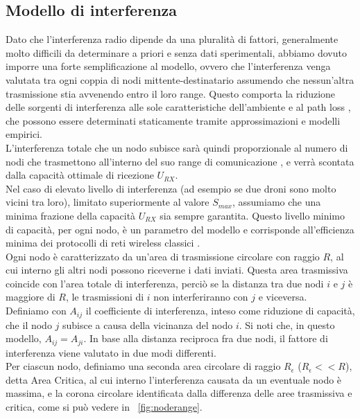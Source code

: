 \subsection{Modello di interferenza}
Dato che l'interferenza radio dipende da una pluralità di fattori, generalmente molto difficili da determinare a priori e senza dati sperimentali, abbiamo dovuto imporre una forte semplificazione al modello, ovvero che l'interferenza venga valutata tra ogni coppia di nodi mittente-destinatario assumendo che nessun'altra trasmissione stia avvenendo entro il loro range. Questo comporta la riduzione delle sorgenti di interferenza alle sole caratteristiche dell'ambiente e al path loss \cite{Killat:2009:EMP:1554307.1554311}, che possono essere determinati staticamente tramite approssimazioni e modelli empirici. \\
L'interferenza totale che un nodo subisce sarà quindi proporzionale al numero di nodi che trasmettono all'interno del suo range di comunicazione \cite{moaveni2005low, 7377438}, e verrà scontata dalla capacità ottimale di ricezione $U_{RX}$. \\
Nel caso di elevato livello di interferenza (ad esempio se due droni sono molto vicini tra loro), limitato superiormente al valore $S_{max}$, assumiamo che una minima frazione della capacità $U_{RX}$ sia sempre garantita. Questo livello minimo di capacità, per ogni nodo, è un parametro del modello e corrisponde all'efficienza minima dei protocolli di reti wireless classici \cite{tanenbaum2003computer}. \\
Ogni nodo è caratterizzato da un'area di trasmissione circolare con raggio $R$, al cui interno gli altri nodi possono riceverne i dati inviati. Questa area trasmissiva coincide con l'area totale di interferenza, perciò se la distanza tra due nodi $i$ e $j$ è maggiore di $R$, le trasmissioni di $i$ non interferiranno con $j$ e viceversa.  \\
Definiamo con $A_{ij}$ il coefficiente di interferenza, inteso come riduzione di capacità, che il nodo $j$ subisce a causa della vicinanza del nodo $i$. Si noti che, in questo modello, $A_{ij} = A_{ji}$.
In base alla distanza reciproca fra due nodi, il fattore di interferenza viene valutato in due modi differenti. \\
Per ciascun nodo, definiamo una seconda area circolare di raggio $R_\epsilon$ ($R_\epsilon << R$), detta Area Critica, al cui interno l'interferenza causata da un eventuale nodo è massima, e la corona circolare identificata dalla differenza delle aree trasmissiva e critica, come si può vedere in \figurename\ \ref{fig:noderange}. \\
